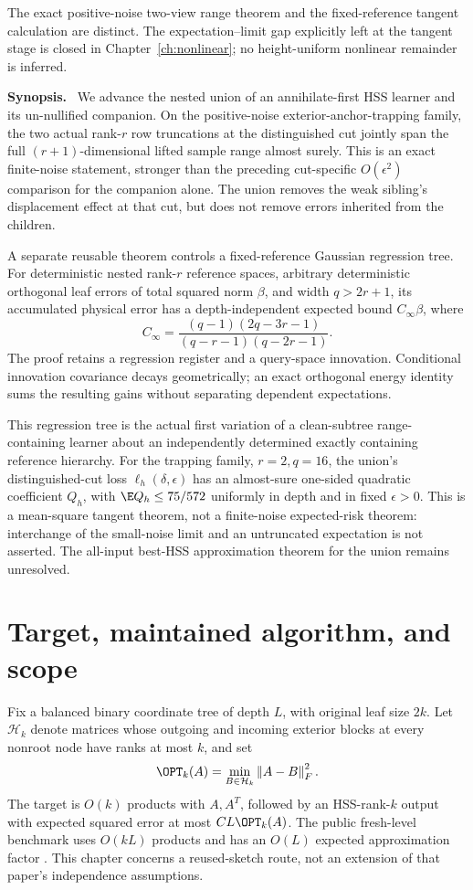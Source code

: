 \documentclass[11pt,oneside,openany,a4paper]{book}
\numberwithin{equation}{chapter}
\theoremstyle{definition}
\theoremstyle{remark}
\newenvironment{chaptersynopsis}{\begingroup\small\textbf{Synopsis.}\ }{\par\endgroup\medskip}
\newcommand{\F}[1]{\left\lVert#1\right\rVert_F}
\newcommand{\HH}{\mathcal H}\newcommand{\SSS}{\mathcal S}
\begin{document}
\begin{scopebox}
The exact positive-noise two-view range theorem and the fixed-reference tangent calculation are distinct. The expectation--limit gap explicitly left at the tangent stage is closed in Chapter~\ref{ch:nonlinear}; no height-uniform nonlinear remainder is inferred.
\end{scopebox}
\thispagestyle{plain}
\begin{chaptersynopsis}
We advance the nested union of an annihilate-first HSS learner and its un-nullified companion. On the positive-noise exterior-anchor-trapping family, the two actual rank-$r$ row truncations at the distinguished cut jointly span the full $(r+1)$-dimensional lifted sample range almost surely. This is an exact finite-noise statement, stronger than the preceding cut-specific $O(\epsilon^2)$ comparison for the companion alone. The union removes the weak sibling's displacement effect at that cut, but does not remove errors inherited from the children.

A separate reusable theorem controls a fixed-reference Gaussian regression tree. For deterministic nested rank-$r$ reference spaces, arbitrary deterministic orthogonal leaf errors of total squared norm $\beta$, and width $q>2r+1$, its accumulated physical error has a depth-independent expected bound $C_\infty\beta$, where
\[
 C_\infty=\frac{(q-1)(2q-3r-1)}{(q-r-1)(q-2r-1)}.
\]
The proof retains a regression register and a query-space innovation. Conditional innovation covariance decays geometrically; an exact orthogonal energy identity sums the resulting gains without separating dependent expectations.

This regression tree is the actual first variation of a clean-subtree range-containing learner about an independently determined exactly containing reference hierarchy. For the trapping family, $r=2,q=16$, the union's distinguished-cut loss $\ell_h(\delta,\epsilon)$ has an almost-sure one-sided quadratic coefficient $Q_h$, with $\E Q_h\le75/572$ uniformly in depth and in fixed $\epsilon>0$. This is a mean-square tangent theorem, not a finite-noise expected-risk theorem: interchange of the small-noise limit and an untruncated expectation is not asserted. The all-input best-HSS approximation theorem for the union remains unresolved.
\end{chaptersynopsis}


\section{Target, maintained algorithm, and scope}
Fix a balanced binary coordinate tree of depth $L$, with original leaf size $2k$. Let $\HH_k$ denote matrices whose outgoing and incoming exterior blocks at every nonroot node have ranks at most $k$, and set
\[
 \OPT_k(A)=\min_{B\in\HH_k}\F{A-B}^2.
\]
The target is $O(k)$ products with $A,A^T$, followed by an HSS-rank-$k$ output with expected squared error at most $CL\OPT_k(A)$. The public fresh-level benchmark uses $O(kL)$ products and has an $O(L)$ expected approximation factor \cite{AmselHSS}. This chapter concerns a reused-sketch route, not an extension of that paper's independence assumptions.
\end{document}
